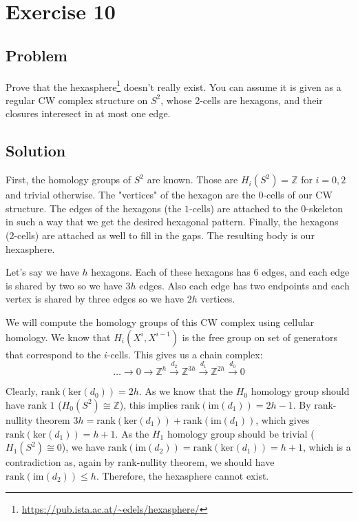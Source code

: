 \documentclass{article}
\begin{document}
\section*{Exercise 10}
\subsection*{Problem}
Prove that the hexasphere\footnote{\url{https://pub.ista.ac.at/~edels/hexasphere/}} doesn't really exist. You can assume it is given as a regular CW complex structure on $S^2$, whose
2-cells are hexagons, and their closures interesect in at most one edge.
\subsection*{Solution}
First, the homology groups of $S^2$ are known. Those are $H_i(S^2) = \mathbb{Z}$ for $i=0,2$ and trivial otherwise.
The "{}vertices"{} of the hexagon are the $0$-cells of our CW structure.
The edges of the hexagons (the $1$-cells) are attached to the 0-skeleton in such a way that we get the desired hexagonal pattern.
Finally, the hexagons (2-cells) are attached as well to fill in the gaps. The resulting body is our hexasphere.

Let's say we have $h$ hexagons. Each of these hexagons has 6 edges, and each edge is shared by two so we have $3h$ edges. Also each edge has two endpoints and each vertex is shared by three edges so we have $2h$ vertices.

We will compute the homology groups of this CW complex using cellular homology. We know that $H_i(X^i,X^{i-1})$ is the free group on set of generators that correspond to the $i$-cells.
This gives us a chain complex:
\begin{equation*}
\dots \xrightarrow{} 0 \xrightarrow{} \mathbb{Z}^h \xrightarrow{d_2} \mathbb{Z}^{3h} \xrightarrow{d_1} \mathbb{Z}^{2h} \xrightarrow{d_0} 0
\end{equation*}

Clearly, $\mathrm{rank} (\mathrm{ker}(d_0)) = 2h$. As we know that the $H_0$ homology group should have rank $1$ ($H_0(S^2) \cong \mathbb{Z}$), this implies $\mathrm{rank}(\mathrm{im}(d_1)) = 2h-1$. By rank-nullity theorem $3h = \mathrm{rank}(\mathrm{ker}(d_1)) + \mathrm{rank}(\mathrm{im}(d_1))$, which gives $\mathrm{rank}(\mathrm{ker}(d_1)) = h+1$. As the $H_1$ homology group should be trivial ($H_1(S^2) \cong 0$), we have $\mathrm{rank}(\mathrm{im}(d_2)) = \mathrm{rank}(\mathrm{ker}(d_1)) = h+1$, which is a contradiction as, again by rank-nullity theorem, we should have $\mathrm{rank}(\mathrm{im}(d_2)) \leq h$. Therefore, the hexasphere cannot exist.
\end{document}
